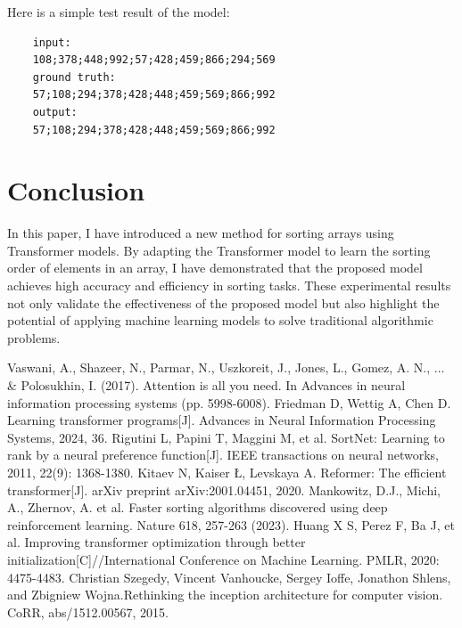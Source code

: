 \documentclass{article}
\begin{document}
Here is a simple test result of the model:
\begin{verbatim}
    input: 
    108;378;448;992;57;428;459;866;294;569
    ground truth:
    57;108;294;378;428;448;459;569;866;992
    output: 
    57;108;294;378;428;448;459;569;866;992
\end{verbatim}

\section{Conclusion}
In this paper, I have introduced a new method for sorting arrays using Transformer models. By adapting the Transformer model to learn the sorting order of elements in an array, I have demonstrated that the proposed model achieves high accuracy and efficiency in sorting tasks. These experimental results not only validate the effectiveness of the proposed model but also highlight the potential of applying machine learning models to solve traditional algorithmic problems.


\begin{thebibliography}{9}
    Vaswani, A., Shazeer, N., Parmar, N., Uszkoreit, J., Jones, L., Gomez, A. N., ... \& Polosukhin, I. (2017). Attention is all you need. In Advances in neural information processing systems (pp. 5998-6008).
    Friedman D, Wettig A, Chen D. Learning transformer programs[J]. Advances in Neural Information Processing Systems, 2024, 36.
    Rigutini L, Papini T, Maggini M, et al. SortNet: Learning to rank by a neural preference function[J]. IEEE transactions on neural networks, 2011, 22(9): 1368-1380.
    Kitaev N, Kaiser Ł, Levskaya A. Reformer: The efficient transformer[J]. arXiv preprint arXiv:2001.04451, 2020.
    Mankowitz, D.J., Michi, A., Zhernov, A. et al. Faster sorting algorithms discovered using deep reinforcement learning. Nature 618, 257-263 (2023).
    Huang X S, Perez F, Ba J, et al. Improving transformer optimization through better initialization[C]//International Conference on Machine Learning. PMLR, 2020: 4475-4483.
    Christian Szegedy, Vincent Vanhoucke, Sergey Ioffe, Jonathon Shlens, and Zbigniew Wojna.Rethinking the inception architecture for computer vision. CoRR, abs/1512.00567, 2015.
\end{thebibliography}
\end{document}
